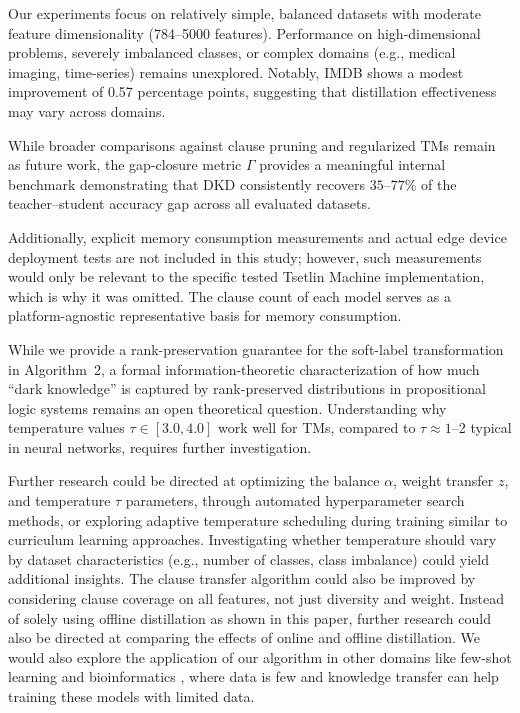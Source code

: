 \documentclass[sn-mathphys-num]{sn-jnl}%
\theoremstyle{thmstyleone}%
\theoremstyle{thmstyletwo}%
\theoremstyle{thmstylethree}%
\begin{document}
Our experiments focus on relatively simple, balanced datasets with moderate feature dimensionality (784--5000 features). Performance on high-dimensional problems, severely imbalanced classes, or complex domains (e.g., medical imaging, time-series) remains unexplored. Notably, IMDB shows a modest improvement of 0.57 percentage points, suggesting that distillation effectiveness may vary across domains.

While broader comparisons against clause pruning and regularized TMs remain 
as future work, the gap-closure metric $\Gamma$ provides a meaningful internal 
benchmark demonstrating that DKD consistently recovers $35$--$77\%$ of the 
teacher--student accuracy gap across all evaluated datasets.

Additionally, explicit memory consumption measurements and actual edge device deployment tests are not included in this study; however, such measurements would only be relevant to the specific tested Tsetlin Machine implementation, which is why it was omitted. The clause count of each model serves as a platform-agnostic representative basis for memory consumption.


While we provide a rank-preservation guarantee for the soft-label transformation 
in Algorithm~2, a formal information-theoretic characterization of how much 
``dark knowledge'' is captured by rank-preserved distributions in propositional 
logic systems remains an open theoretical question. Understanding why temperature values $\tau \in [3.0, 4.0]$ work well for TMs, compared to $\tau \approx 1$--2 typical in neural networks, requires further investigation.

Further research could be directed at optimizing the balance $\alpha$, weight transfer $z$, and temperature $\tau$ parameters, through automated hyperparameter search methods, or exploring adaptive temperature scheduling during training similar to curriculum learning approaches. Investigating whether temperature should vary by dataset characteristics (e.g., number of classes, class imbalance) could yield additional insights. The clause transfer algorithm could also be improved by considering clause coverage on all features, not just diversity and weight. Instead of solely using offline distillation as shown in this paper, further research could also be directed at comparing the effects of online and offline distillation. We would also explore the application of our algorithm in other domains like few-shot learning \cite{anjum2025using, DBLP:conf/bigdataconf/GuoAZ22, anjum2025weighted} and bioinformatics \cite{woessner2024identifying}, where data is few and knowledge transfer can help training these models with limited data.
\end{document}
